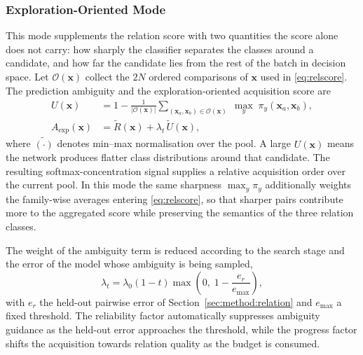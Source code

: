 \documentclass[final,5p,times,twocolumn]{elsarticle}
\newcommand{\vx}{\mathbf{x}}
\begin{document}
\subsubsection{Exploration-Oriented Mode}
\label{sec:method:candidate:exp}

This mode supplements the relation score with two quantities the score alone
does not carry: how sharply the classifier separates the classes around a
candidate, and how far the candidate lies from the rest of the batch in
decision space. Let $\mathcal{O}(\vx)$ collect the $2N$ ordered comparisons of
$\vx$ used in \eqref{eq:relscore}. The prediction ambiguity and the
exploration-oriented acquisition score are
\begin{equation}
\begin{aligned}
U(\vx)&=1-\frac{1}{|\mathcal{O}(\vx)|}
\sum_{(\vx_a,\vx_b)\in\mathcal{O}(\vx)}\;
\max_{y}\;\pi_y(\vx_a,\vx_b),\\
A_{\mathrm{exp}}(\vx)&=\widetilde R(\vx)+\lambda_t\,\widetilde U(\vx),
\end{aligned}
\label{eq:expscore}
\end{equation}
where $\widetilde{(\cdot)}$ denotes min--max normalisation over the pool. A
large $U(\vx)$ means the network produces flatter class distributions around
that candidate. The resulting softmax-concentration signal supplies a relative
acquisition order over the current pool. In this mode the same sharpness
$\max_y\pi_y$ additionally weights the family-wise averages entering
\eqref{eq:relscore}, so that sharper pairs contribute more to the aggregated
score while preserving the semantics of the three relation classes.

The weight of the ambiguity term is reduced according to the search stage and
the error of the model whose ambiguity is being sampled,
\begin{equation}
\lambda_t=\lambda_0(1-t)\max\!\left(0,\;1-\frac{e_r}{e_{\max}}\right),
\label{eq:lambda}
\end{equation}
with $e_r$ the held-out pairwise error of
Section~\ref{sec:method:relation} and $e_{\max}$ a fixed threshold. The
reliability factor automatically suppresses ambiguity guidance as the
held-out error approaches the threshold, while the progress factor shifts the
acquisition towards relation quality as the budget is consumed.
\end{document}
